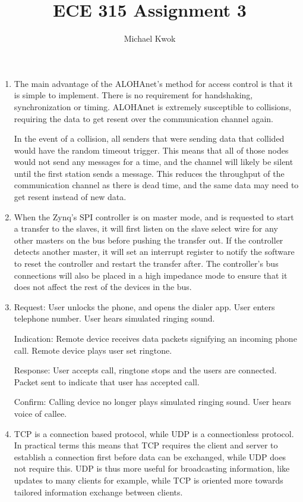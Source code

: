 \documentclass{article}
\title{ECE 315 Assignment 3}
\author{Michael Kwok}
\begin{document}
\maketitle
\begin{enumerate}
      \item The main advantage of the ALOHAnet's method for access control is that it is simple to implement. There is no requirement for handshaking, synchronization or timing. ALOHAnet is extremely susceptible to collisions, requiring the data to get resent over the communication channel again.

            In the event of a collision, all senders that were sending data that collided would have the random timeout trigger. This means that all of those nodes would not send any messages for a time, and the channel will likely be silent until the first station sends a message. This reduces the throughput of the communication channel as there is dead time, and the same data may need to get resent instead of new data.

      \item When the Zynq's SPI controller is on master mode, and is requested to start a transfer to the slaves, it will first listen on the slave select wire for any other masters on the bus before pushing the transfer out. If the controller detects another master, it will set an interrupt register to notify the software to reset the controller and restart the transfer after. The controller's bus connections will also be placed in a high impedance mode to ensure that it does not affect the rest of the devices in the bus.

      \item Request: User unlocks the phone, and opens the dialer app. User enters telephone number. User hears simulated ringing sound.

            Indication: Remote device receives data packets signifying an incoming phone call. Remote device plays user set ringtone.

            Response: User accepts call, ringtone stops and the users are connected. Packet sent to indicate that user has accepted call.

            Confirm: Calling device no longer plays simulated ringing sound. User hears voice of callee.

      \item TCP is a connection based protocol, while UDP is a connectionless protocol. In practical terms this means that TCP requires the client and server to establish a connection first before data can be exchanged, while UDP does not require this. UDP is thus more useful for broadcasting information, like updates to many clients for example, while TCP is oriented more towards tailored information exchange between clients.


\end{enumerate}
\end{document}
